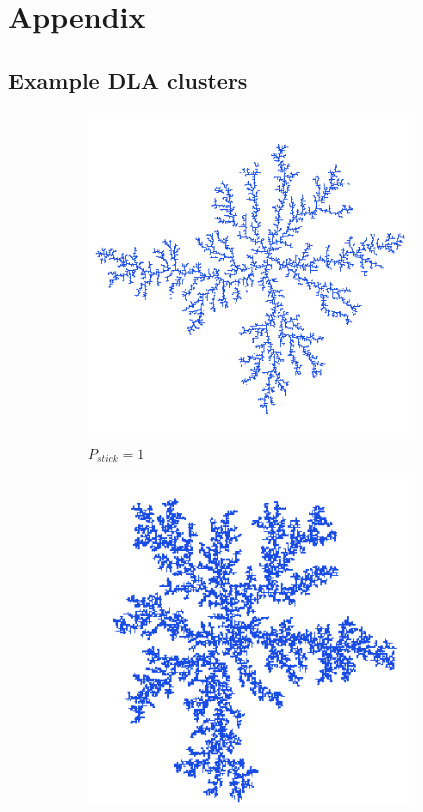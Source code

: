 \documentclass[10pt, twocolumn]{article} %
\begin{document}
\section*{Appendix}

\subsection*{Example DLA clusters}

\begin{figure}[h!]
\centering
  \begin{subfigure}[t]{0.45\textwidth}
    \centering
    \includegraphics[width=0.95\textwidth]{p1.png}
    \caption{$P_{stick} = 1$}
  \end{subfigure}
  \hfill
  \begin{subfigure}[t]{0.45\textwidth}
    \centering
    \includegraphics[width=0.95\textwidth]{p01.png}

\end{subfigure}
\end{figure}
\end{document}

